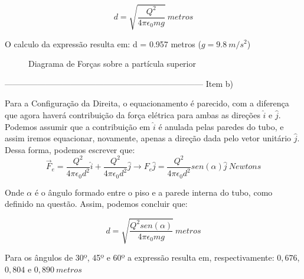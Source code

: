 \documentclass[journal,comsoc]{IEEEtran}
\begin{document}
    \begin{equation}
    	d = \sqrt{\frac{Q^2}{4\pi{\epsilon}_{0}mg}}\ metros
    \end{equation}

\par O calculo da expressão resulta em: d = 0.957 metros ($g=9.8\ m/s^2$)

\begin{figure}
\centering
{}
\caption{Diagrama de Forças sobre a partícula superior}
\end{figure}

------------------------------------------------------------------------
Item b)
\par Para a Configuração da Direita, o equacionamento é parecido, com a diferença que agora haverá contribuição da força elétrica para ambas as direções $\hat{i}$ e $\hat{j}$. Podemos assumir que a contribuição em $\hat{i}$ é anulada pelas paredes do tubo, e assim iremos equacionar, novamente, apenas a direção dada pelo vetor unitário $\hat{j}$. Dessa forma, podemos escrever que:
\begin{equation}
 	\vec{F}_{e} = \frac{Q^2}{4\pi{\epsilon}_{0}d^2}\hat{i} + \frac{Q^2}{4\pi{\epsilon}_{0}d^2}\hat{j} \rightarrow F_{e}\hat{j} = \frac{Q^2}{4\pi{\epsilon}_{0}d^2}sen(\alpha)\hat{j}\ Newtons
\end{equation}

\par Onde $\alpha$ é o ângulo formado entre o piso e a parede interna do tubo, como definido na questão. Assim, podemos concluir que:

\begin{equation}
    	d = \sqrt{\frac{Q^2sen(\alpha)}{4\pi{\epsilon}_{0}mg}}\ metros
\end{equation}

\par Para os ângulos de 30º, 45º e 60º a expressão resulta em, respectivamente:
$0,676$, $0,804$ e $0,890\ metros$
\end{document}
